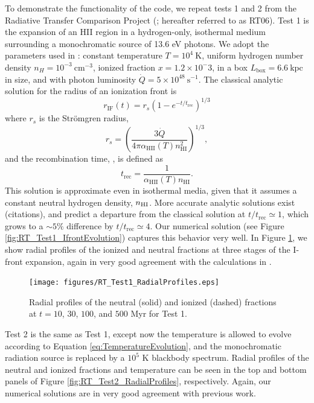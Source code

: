 \documentclass[preprint2]{aastex}              %
\begin{document}
To demonstrate the functionality of the code, we repeat tests 1 and 2 from the Radiative Transfer Comparison Project (\cite{Iliev2006}; hereafter referred to as RT06).  Test 1 is the expansion of an HII region in a hydrogen-only, isothermal medium surrounding a monochromatic source of 13.6 eV photons. We adopt the parameters used in \citet{Wise2011}: constant temperature $T = 10^4 \ \mathrm{K}$, uniform hydrogen number density $n_H = 10^{-3} \ \mathrm{cm^{-3}}$, ionized fraction $x = 1.2 \times 10^-3$, in a box $L_{\mathrm{box}} = 6.6 \ \mathrm{kpc}$ in size, and with photon luminosity $\dot{Q} = 5\times10^{48} \ \mathrm{s^{-1}}$.  The classical analytic solution for the radius of an ionization front is 
\begin{equation}
    r_{\mathrm{IF}}(t) = r_s (1 - e^{-t/t_{\mathrm{rec}}})^{1/3}
\end{equation}    
where $r_s$ is the Str\"{o}mgren radius, 
\begin{equation}
    r_s = \left(\frac{3 \dot{Q}}{4\pi \alpha_{\mathrm{HII}}(T) n_{\mathrm{HI}}^2}\right)^{1/3} ,
\end{equation}
and the recombination time, \trec, is defined as
\begin{equation}
    t_{\mathrm{rec}} = \frac{1}{\alpha_{\mathrm{HII}}(T) n_{\mathrm{HI}}} .
\end{equation}
This solution is approximate even in isothermal media, given that it
assumes a constant neutral hydrogen density, $n_{\text{HI}}$. More accurate analytic
solutions exist (citations), and predict a departure from the classical
solution at $t/t_{\mathrm{rec}} \simeq 1$, which grows to a $\sim 5 \%$
difference by $t/t_{\mathrm{rec}} \simeq 4$. Our numerical solution (see
Figure \ref{fig:RT_Test1_IfrontEvolution}) captures this behavior very well.  In Figure \ref{fig:RT_Test1_RadialProfiles}, we show radial profiles of the ionized and neutral fractions at three stages of the I-front expansion, again in very good agreement with the calculations in \citet{Iliev2006}.

\begin{figure}[htbp]
\centering
\texttt{[image: figures/RT\_Test1\_RadialProfiles.eps]} 
\caption[]{Radial profiles of the neutral (solid) and ionized (dashed) fractions at $t = 10$, $30$, $100$, and $500$ Myr for Test 1.}
\label{fig:RT_Test1_RadialProfiles}
\end{figure}

Test 2 is the same as Test 1, except now the temperature is allowed to evolve according to Equation \ref{eq:TemperatureEvolution}, and the monochromatic radiation source is replaced by a $10^5$ K blackbody spectrum.  Radial profiles of the neutral and ionized fractions and temperature can be seen in the top and bottom panels of Figure \ref{fig:RT_Test2_RadialProfiles}, respectively.  Again, our numerical solutions are in very good agreement with previous work.
\end{document}
